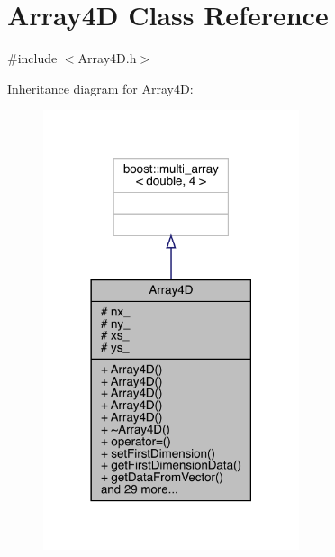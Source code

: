 \hypertarget{class_array4_d}{}\section{Array4D Class Reference}
\label{class_array4_d}


{\ttfamily \#include $<$Array4\+D.\+h$>$}



Inheritance diagram for Array4D\+:
\nopagebreak
\begin{figure}[H]
\begin{center}
\leavevmode
\includegraphics[width=213pt]{class_array4_d__inherit__graph}
\end{center}
\end{figure}


